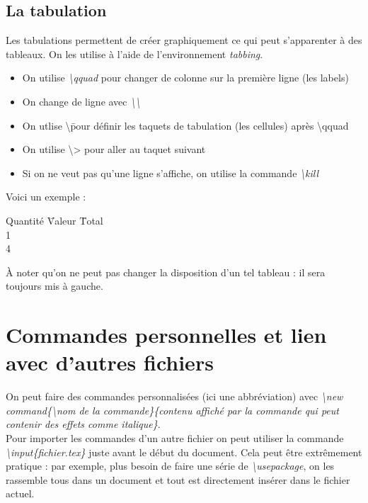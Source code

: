 \documentclass[a4paper, 10pt]{article}
\begin{document}
\normalsize

\subsection{La tabulation}

Les tabulations permettent de créer graphiquement ce qui peut s'apparenter à des tableaux. On les utilise à l'aide de l'environnement \textit{tabbing}. 

\begin{itemize}

\item On utilise \textit{\textbackslash qquad} pour changer de colonne sur la première ligne (les labels)
\item On change de ligne avec \textit{\textbackslash \textbackslash}
\item On utlise \textbackslash \= pour définir les taquets de tabulation (les cellules) après \textbackslash qquad
\item On utilise \textbackslash > pour aller au taquet suivant
\item Si on ne veut pas qu'une ligne s'affiche, on utilise la commande \textit{\textbackslash kill}

\end{itemize}

Voici un exemple :

\begin{tabbing}
Quantité \qquad \= Valeur \qquad  \= Total \\
1   \\
4  
\end{tabbing}

\`A noter qu'on ne peut pas changer la disposition d'un tel tableau : il sera toujours mis à gauche.

\section{Commandes personnelles et lien avec d'autres fichiers}

On peut faire des commandes personnalisées (ici une abbréviation) avec \textit{\textbackslash new command\{\textbackslash nom de la  commande\}\{contenu affiché par la commande qui peut contenir des effets comme italique\}}. \\
Pour importer les commandes d'un autre fichier on peut utiliser la commande \textit{\textbackslash input\{fichier.tex\}} juste avant le début du document. Cela peut être extrêmement pratique : par exemple, plus besoin de faire une série de \emph{\textbackslash usepackage}, on les rassemble tous dans un document et tout est directement insérer dans le fichier actuel.
\end{document}
